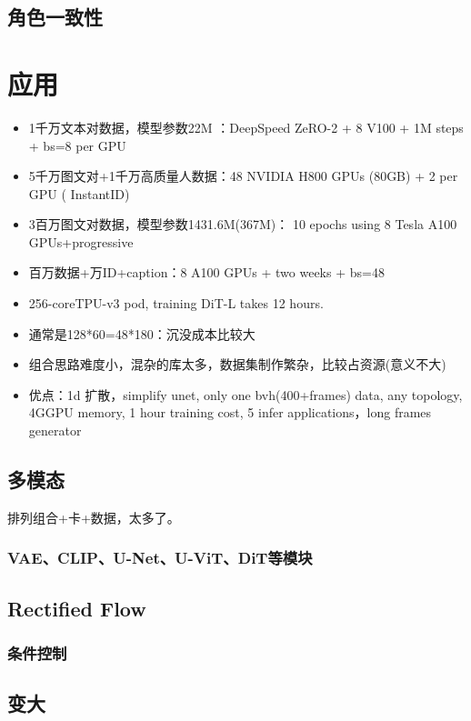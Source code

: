 \documentclass[lang=cn,newtx,10pt,scheme=chinese]{elegantbook}
\begin{document}
\subsection{角色一致性}

\section{应用}
\begin{itemize}
    \item 1千万文本对数据，模型参数22M ：DeepSpeed ZeRO-2 +  8 V100 + 1M steps + bs=8 per GPU
    \item 5千万图文对+1千万高质量人数据：48 NVIDIA H800 GPUs (80GB) + 2 per GPU ( InstantID)
    \item 3百万图文对数据，模型参数1431.6M(367M)： 10 epochs using 8 Tesla A100 GPUs+progressive 
    \item 百万数据+万ID+caption：8 A100 GPUs + two weeks + bs=48
    \item 256-coreTPU-v3 pod, training DiT-L takes 12 hours.
    \item 通常是128*60=48*180：沉没成本比较大
    \item 组合思路难度小，混杂的库太多，数据集制作繁杂，比较占资源(意义不大)
    \item 优点：1d 扩散，simplify unet, only one bvh(400+frames) data, any topology,  4GGPU memory, 1 hour training cost, 5 infer applications，long frames generator
\end{itemize}

\subsection{多模态}

排列组合+卡+数据，太多了。

\subsubsection{VAE、CLIP、U-Net、U-ViT、DiT等模块}
\subsection{Rectified Flow}
\subsubsection{条件控制}
\subsection{变大}
\end{document}
